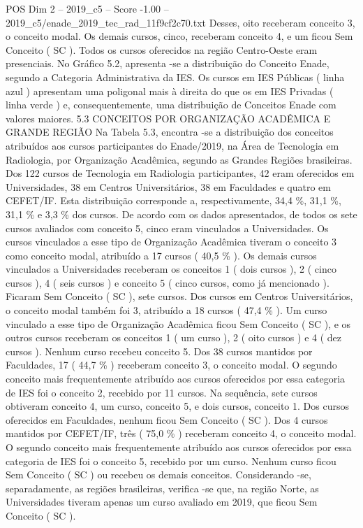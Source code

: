 \begin{textsample}{POS Dim 2 – 2019\_c5 – Score -1.00 – 2019\_c5/enade\_2019\_tec\_rad\_11f9cf2c70.txt}
Desses, oito receberam conceito 3, o conceito modal.
Os demais cursos, cinco, receberam conceito 4, e um ficou Sem Conceito ( SC ).
Todos os cursos oferecidos na região Centro-Oeste eram presenciais.
No Gráfico 5.2, apresenta -se a distribuição do Conceito Enade, segundo a Categoria Administrativa da IES.
Os cursos em IES Públicas ( linha azul ) apresentam uma poligonal mais à direita do que os em IES Privadas ( linha verde ) e, consequentemente, uma distribuição de Conceitos Enade com valores maiores. 5.3 CONCEITOS POR ORGANIZAÇÃO ACADÊMICA E GRANDE REGIÃO Na Tabela 5.3, encontra -se a distribuição dos conceitos atribuídos aos cursos participantes do Enade/2019, na Área de Tecnologia em Radiologia, por Organização Acadêmica, segundo as Grandes Regiões brasileiras.
Dos 122 cursos de Tecnologia em Radiologia participantes, 42 eram oferecidos em Universidades, 38 em Centros Universitários, 38 em Faculdades e quatro em CEFET/IF.
Esta distribuição corresponde a, respectivamente, 34,4 \%, 31,1 \%, 31,1 \% e 3,3 \% dos cursos.
De acordo com os dados apresentados, de todos os sete cursos avaliados com conceito 5, cinco eram vinculados a Universidades.
Os cursos vinculados a esse tipo de Organização Acadêmica tiveram o conceito 3 como conceito modal, atribuído a 17 cursos ( 40,5 \% ).
Os demais cursos vinculados a Universidades receberam os conceitos 1 ( dois cursos ), 2 ( cinco cursos ), 4 ( seis cursos ) e conceito 5 ( cinco cursos, como já mencionado ).
Ficaram Sem Conceito ( SC ), sete cursos.
Dos cursos em Centros Universitários, o conceito modal também foi 3, atribuído a 18 cursos ( 47,4 \% ).
Um curso vinculado a esse tipo de Organização Acadêmica ficou Sem Conceito ( SC ), e os outros cursos receberam os conceitos 1 ( um curso ), 2 ( oito cursos ) e 4 ( dez cursos ).
Nenhum curso recebeu conceito 5.
Dos 38 cursos mantidos por Faculdades, 17 ( 44,7 \% ) receberam conceito 3, o conceito modal.
O segundo conceito mais frequentemente atribuído aos cursos oferecidos por essa categoria de IES foi o conceito 2, recebido por 11 cursos.
Na sequência, sete cursos obtiveram conceito 4, um curso, conceito 5, e dois cursos, conceito 1.
Dos cursos oferecidos em Faculdades, nenhum ficou Sem Conceito ( SC ).
Dos 4 cursos mantidos por CEFET/IF, três ( 75,0 \% ) receberam conceito 4, o conceito modal.
O segundo conceito mais frequentemente atribuído aos cursos oferecidos por essa categoria de IES foi o conceito 5, recebido por um curso.
Nenhum curso ficou Sem Conceito ( SC ) ou recebeu os demais conceitos.
Considerando -se, separadamente, as regiões brasileiras, verifica -se que, na região Norte, as Universidades tiveram apenas um curso avaliado em 2019, que ficou Sem Conceito ( SC ).

\end{textsample}
